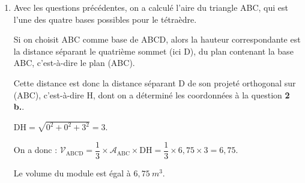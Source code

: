 \documentclass[10pt]{article}
\providecommand{\vect}[1]{\overrightarrow{#1}}
\providecommand{\vectt}[1]{\overrightarrow{\mathrm{#1}}}
\providecommand{\np}[2][]{{#2~#1}}
\begin{document}
\begin{enumerate}
\begin{enumerate}
\begin{itemize}
				Or, une équation cartésienne du plan (ABC) étant $z=0$, un vecteur normal au plan (ABC) est  $\vect{m}\begin{pmatrix} 0\\0\\1 \end{pmatrix}$
				
				Les vecteurs $\vect{m}$ et $\vectt{HD}$ sont colinéaires, donc la droite (HD) est orthogonale au plan (ABC).
				
			\end{itemize} 
		
		
		Donc le point H$\left(\dfrac{3}{2} ; 1 ; 0\right)$ est le projeté orthogonal du point D sur le plan (ABC).
	\end{enumerate}
	\item  Avec les questions précédentes, on a calculé l'aire du triangle ABC, qui est l'une des quatre bases possibles pour le tétraèdre.
	
	Si on choisit ABC comme base de ABCD, alors la hauteur correspondante est la distance séparant le quatrième sommet (ici D), du plan contenant la base ABC, c'est-à-dire le plan (ABC).
	
	Cette distance est donc la distance séparant D de son projeté orthogonal sur (ABC), c'est-à-dire H, dont on a déterminé les coordonnées à la question \textbf{2 b.}.
	
	$\mathrm{DH} = \sqrt{0^2 + 0^2 + 3 ^2 } = 3$.
	
	On a donc : \quad $\mathcal{V}_{\mathrm{ABCD}} = \dfrac{1}{3} \times \mathcal{A}_{\mathrm{ABC}} \times \mathrm{DH} = \dfrac{1}{3} \times 6,75 \times 3 = 6,75$.
	
	Le volume du module est égal  à  $\np[m^3]{6,75}$.

\end{enumerate}
\end{document}
